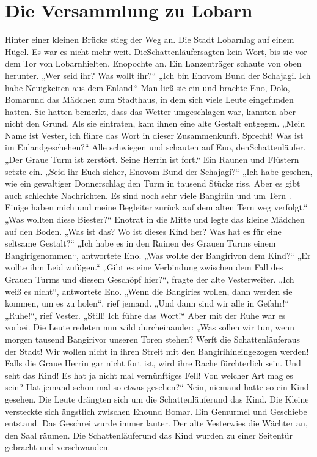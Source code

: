 \documentclass[12pt,a4paper,onecolumn,twoside,ngerman]{book}
\newcommand{\Tern}{Tern }
\newcommand{\Bangiri}{Bangiri}
\newcommand{\Enland}{Enland}
\newcommand{\Schattenjager}{Schattenläufer}
\newcommand{\Eno}{Eno}
\newcommand{\Bomar}{Bomar}
\newcommand{\Do}{Dolo}
\newcommand{\Lobarn}{Lobarn}
\newcommand{\Vester}{Vester}
\begin{document}
\section{Die Versammlung zu \Lobarn}
Hinter einer kleinen Brücke stieg der Weg an. Die Stadt \Lobarn lag auf einem  Hügel. Es war es nicht mehr weit. Die\Schattenjager sagten kein Wort, bis sie vor dem Tor von \Lobarn hielten. \Eno pochte an.
Ein Lanzenträger schaute von oben herunter. 
„Wer seid ihr? Was wollt ihr?“
„Ich bin \Eno vom Bund der Schajagi. Ich habe Neuigkeiten aus dem \Enland.“ 
Man ließ sie ein und brachte \Eno, \Do, \Bomar und das Mädchen zum Stadthaus, in dem sich viele Leute eingefunden hatten. Sie hatten bemerkt, dass das Wetter umgeschlagen war, kannten aber nicht den Grund. Als sie eintraten, kam ihnen eine alte Gestalt entgegen. 
„Mein Name ist \Vester, ich führe das Wort in dieser Zusammenkunft. Sprecht! Was ist im \Enland geschehen?“
Alle schwiegen und schauten auf \Eno, den\Schattenjager.
„Der Graue Turm ist zerstört. Seine Herrin ist fort.“
Ein Raunen und Flüstern setzte ein.
„Seid ihr Euch sicher, \Eno vom Bund der Schajagi?“
„Ich habe gesehen, wie ein gewaltiger Donnerschlag den Turm in tausend Stücke riss. Aber es gibt auch schlechte Nachrichten. Es sind noch sehr viele \Bangiri in und um \Tern. Einige haben mich und meine Begleiter zurück auf dem alten \Tern{weg} verfolgt.“
„Was wollten diese Biester?“
\Eno trat in die Mitte und legte das kleine Mädchen auf den Boden.
„Was ist das? Wo ist dieses Kind her? Was hat es für eine seltsame Gestalt?“
„Ich habe es in den Ruinen des Grauen Turms einem \Bangiri genommen“, antwortete \Eno.
„Was wollte der \Bangiri von dem Kind?“
„Er wollte ihm Leid zufügen.“
„Gibt es eine Verbindung zwischen dem Fall des Grauen Turms und diesem Geschöpf hier?“, fragte der alte \Vester weiter.
„Ich weiß es nicht“, antwortete \Eno.
„Wenn die \Bangiri es wollen, dann werden sie kommen, um es zu holen“, rief jemand. „Und dann sind wir alle in Gefahr!“
„Ruhe!“, rief \Vester. „Still! Ich führe das Wort!“
Aber mit der Ruhe war es vorbei. Die Leute redeten nun wild durcheinander: „Was sollen wir tun, wenn morgen tausend \Bangiri vor unseren Toren stehen? Werft die \Schattenjager aus der Stadt! Wir wollen nicht in ihren Streit mit den \Bangiri hineingezogen werden! Falls die Graue Herrin gar nicht fort ist, wird ihre Rache fürchterlich sein. Und seht das Kind! Es hat ja nicht mal vernünftiges Fell! Von welcher Art mag es sein? Hat jemand schon mal so etwas gesehen?“
Nein, niemand hatte so ein Kind gesehen. Die Leute drängten sich um die \Schattenjager und das Kind. Die Kleine versteckte sich ängstlich zwischen \Eno und \Bomar. Ein Gemurmel und Geschiebe entstand. Das Geschrei wurde immer lauter. Der alte \Vester wies die Wächter an, den Saal räumen. Die \Schattenjager und das Kind wurden zu einer Seitentür gebracht und verschwanden.
\end{document}
